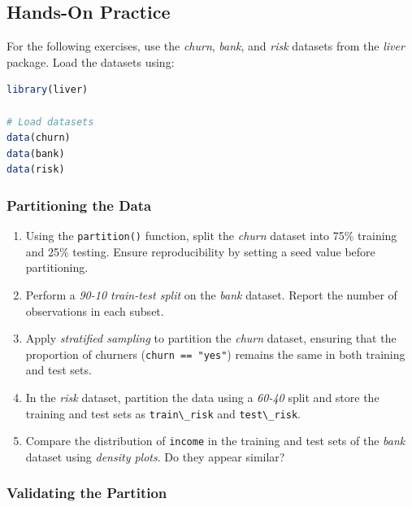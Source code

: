 \documentclass[
]{book}
\newcommand{\passthrough}[1]{#1}
\theoremstyle{definition}
\theoremstyle{definition}
\theoremstyle{definition}
\theoremstyle{definition}
\theoremstyle{remark}
\begin{document}
\subsection*{Hands-On Practice}\label{hands-on-practice}

For the following exercises, use the \emph{churn}, \emph{bank}, and \emph{risk} datasets from the \emph{liver} package. Load the datasets using:

\begin{lstlisting}[language=R]
library(liver)

# Load datasets
data(churn)
data(bank)
data(risk)
\end{lstlisting}

\subsubsection*{Partitioning the Data}\label{partitioning-the-data}

\begin{enumerate}
\def\labelenumi{\arabic{enumi}.}
\setcounter{enumi}{14}
\item
  Using the \passthrough{\lstinline!partition()!} function, split the \emph{churn} dataset into 75\% training and 25\% testing. Ensure reproducibility by setting a seed value before partitioning.
\item
  Perform a \emph{90-10 train-test split} on the \emph{bank} dataset. Report the number of observations in each subset.
\item
  Apply \emph{stratified sampling} to partition the \emph{churn} dataset, ensuring that the proportion of churners (\passthrough{\lstinline!churn == "yes"!}) remains the same in both training and test sets.
\item
  In the \emph{risk} dataset, partition the data using a \emph{60-40} split and store the training and test sets as \passthrough{\lstinline!train\_risk!} and \passthrough{\lstinline!test\_risk!}.
\item
  Compare the distribution of \passthrough{\lstinline!income!} in the training and test sets of the \emph{bank} dataset using \emph{density plots}. Do they appear similar?
\end{enumerate}

\subsubsection*{Validating the Partition}\label{validating-the-partition}
\end{document}
